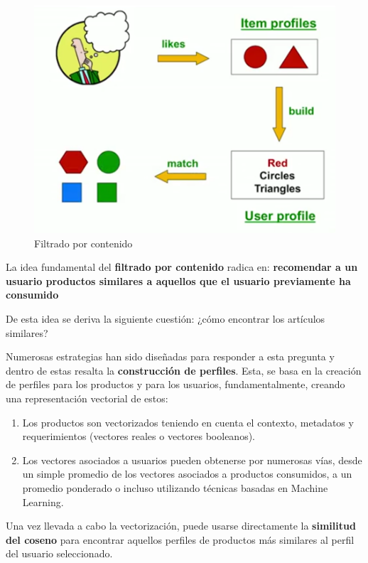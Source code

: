 \documentclass[14pt]{extarticle}
\begin{document}
\begin{figure}[H]
    \centering
    \includegraphics[width=\textwidth]{./images/content-bases_filtering.png}
    \caption{Filtrado por contenido}
    \label{Filtrado por contenido}
\end{figure}


La idea fundamental del \textbf{filtrado por contenido} radica en: \textbf{recomendar a un usuario productos similares a aquellos que el usuario previamente ha consumido}

De esta idea se deriva la siguiente cuestión: ¿cómo encontrar los artículos similares?

Numerosas estrategias han sido diseñadas para responder a esta pregunta y dentro de estas resalta la \textbf{construcción de perfiles}. Esta, se basa en la creación de perfiles para los productos y para los usuarios, fundamentalmente, creando una representación vectorial de estos:

\begin{enumerate}
    \item Los productos son vectorizados teniendo en cuenta el contexto, metadatos y requerimientos (vectores reales o vectores booleanos).
    \item Los vectores asociados a usuarios pueden obtenerse por numerosas vías, desde un simple promedio de los vectores asociados a productos consumidos, a un promedio ponderado o incluso utilizando técnicas basadas en Machine Learning.
\end{enumerate}

Una vez llevada a cabo la vectorización, puede usarse directamente la \textbf{similitud del coseno} para encontrar aquellos perfiles de productos más similares al perfil del usuario seleccionado.
\end{document}
